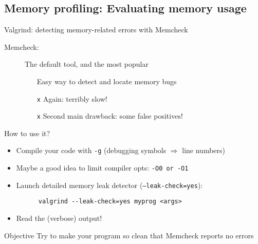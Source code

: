 \documentclass[10pt,xcolor=table]{beamer}
\begin{document}
\subsection{Memory profiling: Evaluating memory usage}

\begin{frame}[fragile]{Valgrind: detecting memory-related errors with
    Memcheck}

  \begin{description}
  \item[Memcheck:] The default tool, and the most popular
    \begin{itemize}
    \item[\checkmark] Easy way to detect and locate memory bugs
    \item[{\tt x}] Again: terribly slow!
    \item[{\tt x}] Second main drawback: some false positives!
    \end{itemize}
  \end{description}

  \pause

  How to use it?
  \begin{itemize}
  \item Compile your code with {\tt -g} (debugging symbols
    $\Rightarrow$ line numbers)
  \item Maybe a good idea to limit compiler opts: {\tt -O0 or -O1}
  \item Launch detailed memory leak detector ({\tt --leak-check=yes}):
    \begin{lstlisting}
      valgrind --leak-check=yes myprog <args>
    \end{lstlisting}
  \item Read the (verbose) output!
  \end{itemize}

  \pause

  \begin{exampleblock}{Objective}
    Try to make your program so clean that Memcheck reports no errors
  \end{exampleblock}
\end{frame}
\end{document}
